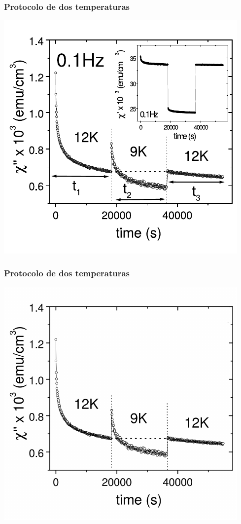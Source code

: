 \documentclass{beamer}
\begin{document}
\begin{frame}
  \frametitle{Protocolo de dos temperaturas}
  \begin{center}
    \includegraphics{images/threetempsprotocol_full.pdf}
  \end{center}
\end{frame}

\begin{frame}
  \frametitle{Protocolo de dos temperaturas}
  \begin{center}
    \includegraphics{images/threetempsprotocol_abridged.pdf}
  \end{center}
\end{frame}
\end{document}
